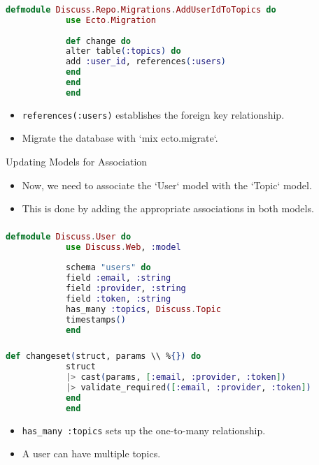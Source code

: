 \documentclass[aspectratio=169, table]{beamer}
\begin{document}
	\begin{frame}[fragile]
		\frametitle{}
		\begin{lstlisting}[language=Elixir]
			defmodule Discuss.Repo.Migrations.AddUserIdToTopics do
			use Ecto.Migration
			
			def change do
			alter table(:topics) do
			add :user_id, references(:users)
			end
			end
			end
		\end{lstlisting}
		\begin{itemize}
			\item \texttt{references(:users)} establishes the foreign key relationship.
			\item Migrate the database with `mix ecto.migrate`.
		\end{itemize}
	\end{frame}
	
	\begin{frame}{Updating Models for Association}
		\begin{itemize}
			\item Now, we need to associate the `User` model with the `Topic` model.
			\item This is done by adding the appropriate associations in both models.
		\end{itemize}
	\end{frame}
	
	\begin{frame}[fragile]
		\frametitle{}
		\begin{lstlisting}[language=Elixir]
			defmodule Discuss.User do
			use Discuss.Web, :model
			
			schema "users" do
			field :email, :string
			field :provider, :string
			field :token, :string
			has_many :topics, Discuss.Topic
			timestamps()
			end
		\end{lstlisting}
	\end{frame}
	
	\begin{frame}[fragile]
		\frametitle{}
		\begin{lstlisting}[language=Elixir]
			def changeset(struct, params \\ %{}) do
			struct
			|> cast(params, [:email, :provider, :token])
			|> validate_required([:email, :provider, :token])
			end
			end
		\end{lstlisting}
		\begin{itemize}
			\item \texttt{has\_many :topics} sets up the one-to-many relationship.
			\item A user can have multiple topics.
		\end{itemize}
	\end{frame}
	
\end{document}
